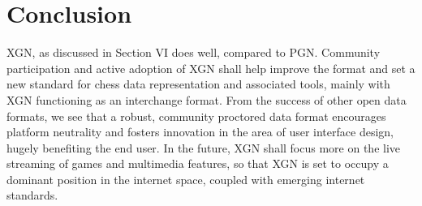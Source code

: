 \documentclass[conference]{IEEEtran}
\begin{document}
\section{Conclusion}
XGN, as discussed in Section VI does well, compared to PGN. Community participation and active adoption of XGN shall help improve the format and set a new standard for chess data representation and associated tools, mainly with XGN functioning as an interchange format. From the success of other open data formats, we see that a robust, community proctored data format encourages platform neutrality and fosters innovation in the area of user interface design, hugely benefiting the end user. In the future, XGN shall focus more on the live streaming of games and multimedia features, so that XGN is set to occupy a dominant position in the internet space, coupled with emerging internet standards.



\nocite{*}

\end{document}
